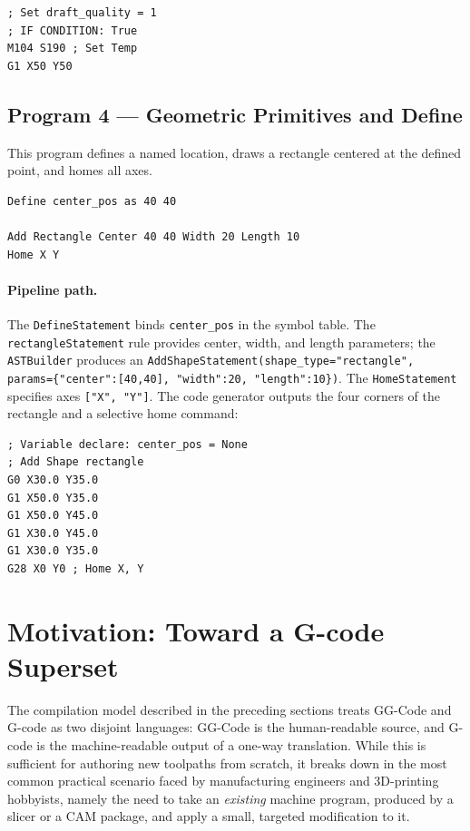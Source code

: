 \begin{verbatim}
; Set draft_quality = 1
; IF CONDITION: True
M104 S190 ; Set Temp
G1 X50 Y50
\end{verbatim}

\subsection*{Program 4 --- Geometric Primitives and Define}

This program defines a named location, draws a rectangle centered at the defined point, and homes all axes.

\begin{verbatim}
Define center_pos as 40 40

Add Rectangle Center 40 40 Width 20 Length 10
Home X Y
\end{verbatim}

\paragraph{Pipeline path.}
The \texttt{DefineStatement} binds \texttt{center\_pos} in the symbol table. The \texttt{rectangleStatement} rule provides center, width, and length parameters; the \texttt{ASTBuilder} produces an \texttt{AddShapeStatement(shape\_type="rectangle", params=\{"center":[40,40], "width":20, "length":10\})}. The \texttt{HomeStatement} specifies axes \texttt{["X", "Y"]}. The code generator outputs the four corners of the rectangle and a selective home command:

\begin{verbatim}
; Variable declare: center_pos = None
; Add Shape rectangle
G0 X30.0 Y35.0
G1 X50.0 Y35.0
G1 X50.0 Y45.0
G1 X30.0 Y45.0
G1 X30.0 Y35.0
G28 X0 Y0 ; Home X, Y
\end{verbatim}

\section{Motivation: Toward a G-code Superset}

The compilation model described in the preceding sections treats GG-Code and G-code as two disjoint languages: GG-Code is the human-readable source, and G-code is the machine-readable output of a one-way translation. While this is sufficient for authoring new toolpaths from scratch, it breaks down in the most common practical scenario faced by manufacturing engineers and 3D-printing hobbyists, namely the need to take an \emph{existing} machine program, produced by a slicer or a CAM package, and apply a small, targeted modification to it.

